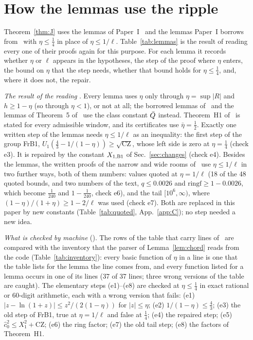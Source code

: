 \section{How the lemmas use the ripple}
\label{app:lemmas}

Theorem~\ref{thm:J} uses the lemmas of Paper~I~\cite{I} and the lemmas Paper~I borrows from~\cite{F,H} with $\eta\le\tfrac14$ in place of $\eta\le1/\ell$.
Table~\ref{tab:lemmas} is the result of reading every one of their proofs again for this purpose.
For each lemma it records whether $\eta$ or $\ell$ appears in the hypotheses, the step of the proof where $\eta$ enters, the bound on $\eta$ that the step needs, whether that bound holds for $\eta\le\tfrac14$, and, where it does not, the repair.

\emph{The result of the reading} \proofst.
Every lemma uses $\eta$ only through $\eta=\sup|R|$ and $h\ge1-\eta$ (so through $\eta<1$), or not at all; the borrowed lemmas of~\cite{F} and the lemmas of Theorem~5 of~\cite{I} use the class constant $\bar Q$ instead.
Theorem~H1 of~\cite{H} is stated for every admissible window, and its certificates use $\bar\eta=\tfrac12$.
Exactly one written step of the lemmas needs $\eta\le1/\ell$ as an inequality: the first step of the group FrB1, $U_1(\tfrac43-1/(1-\eta))\ge\sqrt{\mathrm{CZ}}$, whose left side is zero at $\eta=\tfrac14$ (check e3).
It is repaired by the constant $X_{1,\rm B1}$ of Sec.~\ref{sec:changes} (check e4).
Besides the lemmas, the written proofs of the narrow and wide rooms of~\cite{I} use $\eta\le1/\ell$ in two further ways, both of them numbers: values quoted at $\eta=1/\ell$ (18 of the 48 quoted bounds, and two numbers of the text, $q\le0.0026$ and $\mathrm{ringf}\ge1-0.0026$, which become $\tfrac1{240}$ and $1-\tfrac1{240}$, check e6), and the tail $[10^6,\infty)$, where $(1-\eta)/(1+\eta)\ge1-2/\ell$ was used (check e7).
Both are replaced in this paper by new constants (Table~\ref{tab:quoted}, App.~\ref{app:C}); no step needed a new idea.

\emph{What is checked by machine} ().
The rows of the table that carry lines of~\cite{I} are compared with the inventory that the parser of Lemma~\ref{lem:chord} reads from the code (Table~\ref{tab:inventory}): every basic function of $\eta$ in a line is one that the table lists for the lemma the line comes from, and every function listed for a lemma occurs in one of its lines (37 of 37 lines; three wrong versions of the table are caught).
The elementary steps (e1)--(e8) are checked at $\eta\le\tfrac14$ in exact rational or 60-digit arithmetic, each with a wrong version that fails: (e1) $|z-\ln(1+z)|\le z^2/(2(1-\eta))$ for $|z|\le\eta$; (e2) $1/(1-\eta)\le\tfrac43$; (e3) the old step of FrB1, true at $\eta=1/\ell$ and false at $\tfrac14$; (e4) the repaired step; (e5) $\hat c_0^2\le X_1^2+\mathrm{CZ}$; (e6) the ring factor; (e7) the old tail step; (e8) the factors of Theorem~H1.


